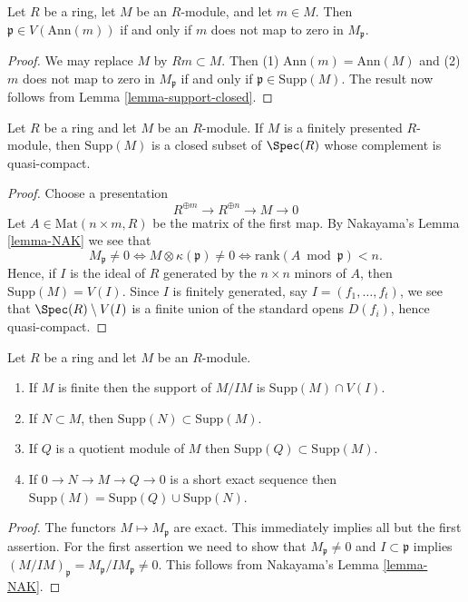 \begin{lemma}
\label{lemma-support-element}
Let $R$ be a ring, let $M$ be an $R$-module, and let $m \in M$.
Then $\mathfrak p \in V(\text{Ann}(m))$ if and only if
$m$ does not map to zero in $M_\mathfrak p$.
\end{lemma}

\begin{proof}
We may replace $M$ by $Rm \subset M$. Then (1) $\text{Ann}(m) = \text{Ann}(M)$
and (2) $m$ does not map to zero in $M_\mathfrak p$ if and only if
$\mathfrak p \in \text{Supp}(M)$.
The result now follows from Lemma \ref{lemma-support-closed}.
\end{proof}

\begin{lemma}
\label{lemma-support-finite-presentation-constructible}
Let $R$ be a ring and let $M$ be an $R$-module.
If $M$ is a finitely presented $R$-module, then $\text{Supp}(M)$ is a
closed subset of $\Spec(R)$ whose complement is quasi-compact.
\end{lemma}

\begin{proof}
Choose a presentation
$$
R^{\oplus m} \longrightarrow R^{\oplus n} \longrightarrow M \to 0
$$
Let $A \in \text{Mat}(n \times m, R)$ be the matrix of the first
map. By Nakayama's Lemma \ref{lemma-NAK} we see that
$$
M_{\mathfrak p} \not = 0 \Leftrightarrow
M \otimes \kappa(\mathfrak p) \not = 0 \Leftrightarrow
\text{rank}(A \bmod \mathfrak p) < n.
$$
Hence, if $I$ is the ideal of $R$ generated by the $n \times n$ minors
of $A$, then $\text{Supp}(M) = V(I)$. Since $I$
is finitely generated, say $I = (f_1, \ldots, f_t)$,
we see that $\Spec(R) \setminus V(I)$ is
a finite union of the standard opens $D(f_i)$, hence quasi-compact.
\end{proof}

\begin{lemma}
\label{lemma-support-quotient}
Let $R$ be a ring and let $M$ be an $R$-module.
\begin{enumerate}
\item If $M$ is finite then the support
of $M/IM$ is $\text{Supp}(M) \cap V(I)$.
\item If $N \subset M$, then $\text{Supp}(N) \subset
\text{Supp}(M)$.
\item If $Q$ is a quotient module of $M$ then $\text{Supp}(Q) \subset
\text{Supp}(M)$.
\item If $0 \to N \to M \to Q \to 0$ is a short exact sequence
then $\text{Supp}(M) = \text{Supp}(Q) \cup \text{Supp}(N)$.
\end{enumerate}
\end{lemma}

\begin{proof}
The functors $M \mapsto M_{\mathfrak p}$ are exact. This immediately
implies all but the first assertion. For the first assertion
we need to show that $M_\mathfrak p \not = 0$ and
$I \subset \mathfrak p$ implies $(M/IM)_{\mathfrak p}
= M_\mathfrak p/IM_\mathfrak p \not = 0$. This follows
from Nakayama's Lemma \ref{lemma-NAK}.
\end{proof}





